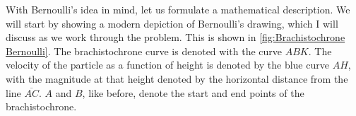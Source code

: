 With Bernoulli's idea in mind, let us formulate a mathematical description. We will start by showing a modern depiction of Bernoulli's drawing, which I will discuss as we work through the problem. This is shown in \autoref{fig:Brachistochrone Bernoulli}.  The \gls{brachistochrone} curve is denoted with the curve $ABK$. The velocity of the particle as a function of height is denoted by the blue curve $AH$, with the magnitude at that height denoted by the horizontal distance from the line $\overline{AC}$. $A$ and $B$, like before, denote the start and end points of the \gls{brachistochrone}.


\begin{figure}[ht]
    \centering


\begin{tikzpicture}[x=0.75pt,y=0.75pt,yscale=-1,xscale=1]


\end{tikzpicture}
\end{figure}
